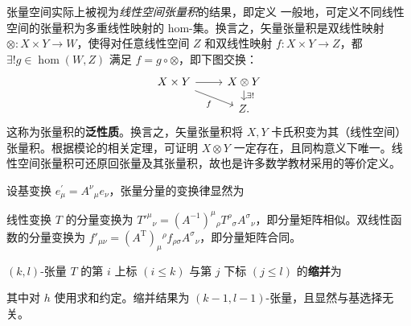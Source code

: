 张量空间实际上被视为\textit{线性空间张量积}的结果，即定义
一般地，可定义不同线性空间的张量积为多重线性映射的 hom-集。换言之，矢量张量积是双线性映射 $\otimes:X\times Y\to W$，使得对任意线性空间 $Z$ 和双线性映射 $f: X\times Y\to Z$，都 $\exists!g\in\hom(W,Z)$ 满足 $f=g\circ\otimes$，即下图交换：
    \[ \begin{tikzcd}[row sep=small]
        X \times Y \arrow[rd, "f"'] \arrow[r] & X\otimes Y \arrow[d, "\exists!"] \\
        & Z.
    \end{tikzcd} \]
这称为张量积的\textbf{泛性质}。换言之，矢量张量积将 $X,Y$ 卡氏积变为其（线性空间）张量积。根据模论的相关定理，可证明 $X\otimes Y$ 一定存在，且同构意义下唯一。线性空间张量积可还原回张量及其张量积，故也是许多数学教材采用的等价定义。


\begin{theorem}
    设基变换 $e_\mu^{\prime}=A^\nu{ }_\mu e_\nu$，张量分量的变换律显然为
\end{theorem}
\begin{example}
    线性变换 $T$ 的分量变换为 $T'^\mu{}_\nu= (A^{-1})^\mu{}_\rho T^\rho{}_\sigma A^\sigma{}_\nu$，即分量矩阵相似。双线性函数的分量变换为 $f'_{\mu\nu}=(A^\mathrm{T})_\mu{}^\rho f_{\rho\sigma} A^\sigma{}_\nu$，即分量矩阵合同。
\end{example}

\begin{definition}
    $(k,l)$-张量 $ T $ 的第 $i$ 上标 $(i \leqslant k)$ 与第 $j$ 下标 $(j \leqslant l)$ 的\textbf{缩并}为
\vspace{-0.1\baselineskip}

\noindent 其中对 $h$ 使用求和约定。缩并结果为 $(k-1,l-1)$-张量，且显然与基选择无关。
\end{definition}

